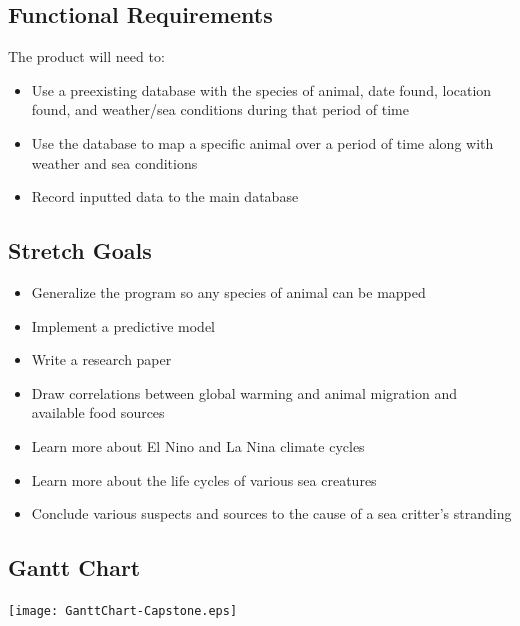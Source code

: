 \documentclass[onecolumn, draftclsnofoot,10pt, compsoc]{IEEEtran}
\begin{document}
\begin{singlespace}
\subsection{Functional Requirements}
The product will need to:
    \begin{itemize}
        \item Use a preexisting database with the species of animal, date found, location found, and weather/sea conditions during that period of time
        \item Use the database to map a specific animal over a period of time along with weather and sea conditions
        \item Record inputted data to the main database
    \end{itemize}
\subsection{Stretch Goals}
    \begin{itemize}
        \item Generalize the program so any species of animal can be mapped
        \item Implement a predictive model
        \item Write a research paper
        \item Draw correlations between global warming and animal migration and available food sources
        \item Learn more about El Nino and La Nina climate cycles
        \item Learn more about the life cycles of various sea creatures
        \item Conclude various suspects and sources to the cause of a sea critter's stranding
    \end{itemize}

\subsection{Gantt Chart}
\texttt{[image: GanttChart-Capstone.eps]}
\end{singlespace}
\end{document}
